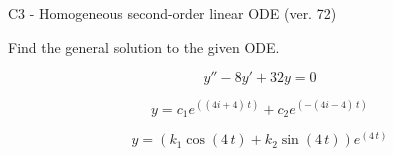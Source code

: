 \begin{exercise}
  \begin{exerciseTitle}C3 - Homogeneous second-order linear ODE (ver. 72)\end{exerciseTitle}
  \begin{exerciseStatement}
    
Find the general solution to the given ODE.

    
\[y''-8y'+32y = 0\]

  \end{exerciseStatement}
  \begin{exerciseAnswer}
    
\[y= c_{1} e^{\left(\left(4 i + 4\right) \, t\right)} + c_{2} e^{\left(-\left(4 i - 4\right) \, t\right)}\]

    
\[y= {\left(k_{1} \cos\left(4 \, t\right) + k_{2} \sin\left(4 \, t\right)\right)} e^{\left(4 \, t\right)}\]

  \end{exerciseAnswer}
\end{exercise}